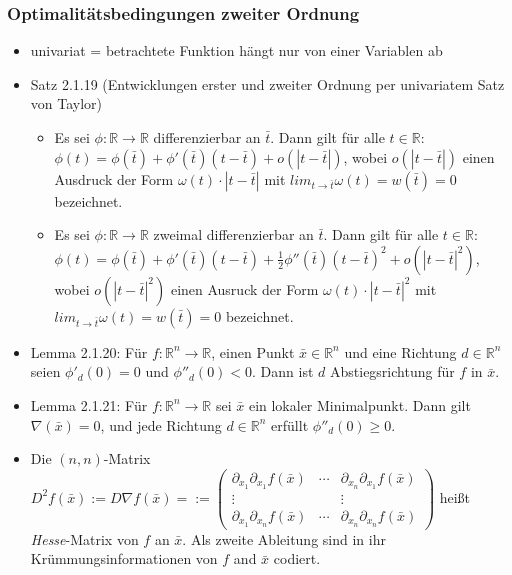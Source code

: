 \documentclass[paper=a4, fontsize=11pt]{scrartcl} %
\numberwithin{equation}{section} %
\numberwithin{figure}{section} %
\numberwithin{table}{section} %
\begin{document}
\subsubsection{Optimalitätsbedingungen zweiter Ordnung}

\begin{itemize}
\item univariat = betrachtete Funktion hängt nur von einer Variablen ab
\item Satz 2.1.19 (Entwicklungen erster und zweiter Ordnung per univariatem Satz von Taylor)
\begin{itemize}
\item Es sei $\phi: \mathbb{R} \rightarrow \mathbb{R}$ differenzierbar an $\bar{t}$. Dann gilt für alle $t \in \mathbb{R}$: $\phi(t) = \phi(\bar{t}) + \phi'(\bar{t})(t-\bar{t}) + o(|t-\bar{t}|)$, wobei $o(|t-\bar{t}|)$ einen Ausdruck der Form $\omega(t) \cdot |t-\bar{t}|$ mit $lim_{t \rightarrow \bar{t}} \omega(t) = w(\bar{t}) = 0$ bezeichnet.
\item Es sei $\phi: \mathbb{R} \rightarrow \mathbb{R}$ zweimal differenzierbar an $\bar{t}$. Dann gilt für alle $t \in \mathbb{R}$: $\phi(t) = \phi(\bar{t}) + \phi'(\bar{t})(t-\bar{t}) + \frac{1}{2} \phi''(\bar{t})(t-\bar{t})^2 + o(|t-\bar{t}|^2)$, wobei $o(|t-\bar{t}|^2)$ einen Ausruck der Form $\omega(t) \cdot |t-\bar{t}|^2$ mit $lim_{t \rightarrow \bar{t}} \omega(t) = w(\bar{t}) = 0$ bezeichnet.
\end{itemize}
\item Lemma 2.1.20: Für $f: \mathbb{R}^n \rightarrow \mathbb{R}$, einen Punkt $\bar{x} \in \mathbb{R}^n$ und eine Richtung $d \in \mathbb{R}^n$ seien $\phi'_d(0) = 0$ und $\phi''_d(0) < 0$. Dann ist $d$ Abstiegsrichtung für $f$ in $\bar{x}$.
\item Lemma 2.1.21: Für $f: \mathbb{R}^n \rightarrow \mathbb{R}$ sei $\bar{x}$ ein lokaler Minimalpunkt. Dann gilt $\nabla(\bar{x}) = 0$, und jede Richtung $d \in \mathbb{R}^n$ erfüllt $\phi''_d(0) \ge 0$.
\item Die $(n,n)$-Matrix $D^2f(\bar{x}) := D\nabla f(\bar{x}) = := \begin{pmatrix}
\partial_{x_1} \partial_{x_1} f(\bar{x}) & \cdots & \partial_{x_n} \partial_{x_1} f(\bar{x})\\
\vdots & & \vdots\\
\partial_{x_1} \partial_{x_n} f(\bar{x}) & \cdots & \partial_{x_n} \partial_{x_n} f(\bar{x})
\end{pmatrix} $ heißt \textit{Hesse}-Matrix von $f$ an $\bar{x}$. Als zweite Ableitung sind in ihr Krümmungsinformationen von $f$ and $\bar{x}$ codiert.

\end{itemize}
\end{document}
